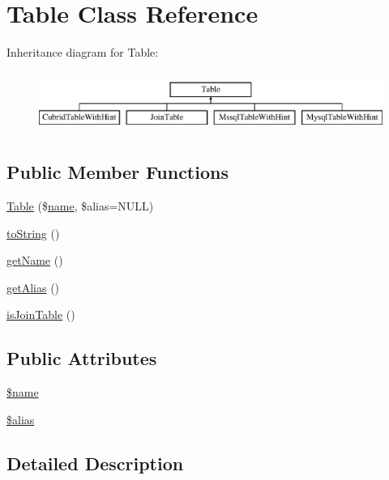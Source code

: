 \hypertarget{classTable}{}\section{Table Class Reference}
\label{classTable}
Inheritance diagram for Table\+:\begin{figure}[H]
\begin{center}
\leavevmode
\includegraphics[height=2.000000cm]{classTable}
\end{center}
\end{figure}
\subsection*{Public Member Functions}
\begin{DoxyCompactItemize}
\item 
\hyperlink{classTable_ab93dfd4a90901959b57787798162b318}{Table} (\$\hyperlink{common_8js_a22c29d2aa8ed6161ce8faa718ef76e68}{name}, \$alias=N\+U\+LL)
\item 
\hyperlink{classTable_a19994c4700a5cf54951216f7782c08d0}{to\+String} ()
\item 
\hyperlink{classTable_a8e2ad8a066449c8fedf8f3a9192db355}{get\+Name} ()
\item 
\hyperlink{classTable_ad278f4d13845b8b52a4496f6c5f0e47d}{get\+Alias} ()
\item 
\hyperlink{classTable_a4d82b6895fe7a4af2ff50dddc955d075}{is\+Join\+Table} ()
\end{DoxyCompactItemize}
\subsection*{Public Attributes}
\begin{DoxyCompactItemize}
\item 
\hyperlink{classTable_a7c7f5d88257a02dd1fbeee22a77c7f39}{\$name}
\item 
\hyperlink{classTable_ac4290933d902bdb3b69a32ebe964df02}{\$alias}
\end{DoxyCompactItemize}


\subsection{Detailed Description}


